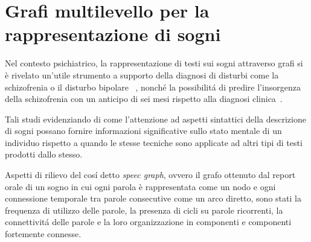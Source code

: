 \chapter{Grafi multilevello per la rappresentazione di sogni}

Nel contesto psichiatrico, la rappresentazione di testi sui sogni attraverso grafi si \`e rivelato un'utile
strumento a supporto della diagnosi di disturbi come la schizofrenia o il disturbo bipolare
~\cite{mota2014graph}, nonch\'e la possibilit\'a di predire l'insorgenza della schizofrenia con un anticipo di
sei mesi rispetto alla diagnosi clinica~\cite{mota2017thought}.

Tali studi evidenziando di come l'attenzione ad aspetti sintattici della descrizione di sogni possano fornire
informazioni significative sullo stato mentale di un individuo rispetto a quando le stesse tecniche sono applicate
ad altri tipi di testi prodotti dallo stesso.

Aspetti di rilievo del cos\'i detto \textit{speec graph}, ovvero il grafo ottenuto dal report orale di un sogno in cui
ogni parola \`e rappresentata come un nodo e ogni connessione temporale tra parole consecutive come un arco diretto,
sono stati la frequenza di utilizzo delle parole, la presenza di cicli su parole ricorrenti, la connettivit\'a delle
parole e la loro organizzazione in componenti e componenti fortemente connesse. \newline






